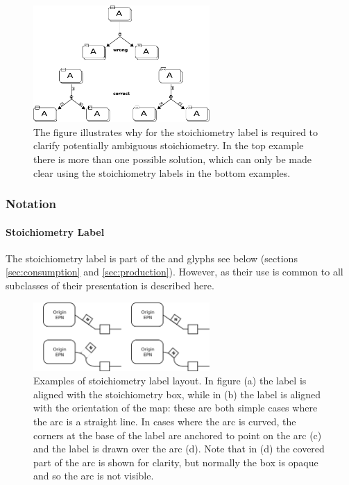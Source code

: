\begin{figure}[htb]
  \centering
  \includegraphics[width=0.6\textwidth]{examples/stoichEx1}
  \caption{The figure illustrates why for the stoichiometry label is
    required to clarify potentially ambiguous stoichiometry. In the
    top example there is more than one possible solution, which can
    only be made clear using the stoichiometry labels in the bottom examples.}
  \label{fig:prod-card}
\end{figure}

\subsubsection{Notation}

\paragraph{Stoichiometry Label}

The stoichiometry label is part of the  and
 glyphs see below (sections
\ref{sec:consumption} and \ref{sec:production}). However, as their use
is common to all subclasses of  their presentation
is described here.

\begin{figure}[H]
  \centering
  \includegraphics[width=0.6\textwidth]{images/stoichlabellayout}
  \caption{Examples of stoichiometry label layout. In figure (a) the
    label is aligned with the stoichiometry box, while in (b) the
    label is aligned with the orientation of the map: these are both
    simple cases where the arc is a straight line. In cases where the
    arc is curved, the corners at the base of the label are anchored
    to point on the arc (c) and the label is drawn over the arc
    (d). Note that in (d) the covered part of the arc is shown for
    clarity, but normally the box is opaque and so the arc is not
    visible.}
  \label{fig:stoichlabellayout}
\end{figure}

